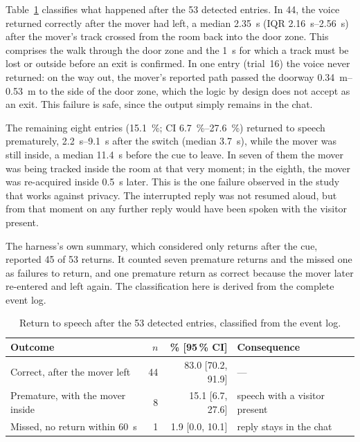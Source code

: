 Table~\ref{tab:ps-return} classifies what happened after the 53 detected
entries. In 44, the voice returned correctly after the mover had left, a median
\SI{2.35}{\second} (IQR \SIrange{2.16}{2.56}{\second}) after the mover's track
crossed from the room back into the door zone. This comprises the walk through
the door zone and the \SI{1}{\second} for which a track must be lost or outside
before an exit is confirmed. In one entry (trial~16) the voice never returned:
on the way out, the mover's reported path passed the doorway
\SIrange{0.34}{0.53}{\metre} to the side of the door zone, which the logic by
design does not accept as an exit. This failure is safe, since the output
simply remains in the chat.

The remaining eight entries (\SI{15.1}{\percent}; CI
\SIrange{6.7}{27.6}{\percent}) returned to speech prematurely,
\SIrange{2.2}{9.1}{\second} after the switch (median \SI{3.7}{\second}), while
the mover was still inside, a median \SI{11.4}{\second} before the cue to
leave. In seven of them the mover was being tracked inside the room at that
very moment; in the eighth, the mover was re-acquired inside
\SI{0.5}{\second} later. This is the one failure observed in the study that
works against privacy. The interrupted reply was not resumed aloud, but from
that moment on any further reply would have been spoken with the visitor
present.

The harness's own summary, which considered only returns after the cue,
reported 45 of 53 returns. It counted seven premature returns and the missed
one as failures to return, and one premature return as correct because the
mover later re-entered and left again. The classification here is derived from
the complete event log.

\begin{table}[htbp]
  \centering
  \caption{Return to speech after the 53 detected entries, classified from the
  event log.}
  \label{tab:ps-return}
  \begin{tabular}{lrrl}
    \toprule
    Outcome & $n$ & \% [95\,\% CI] & Consequence \\
    \midrule
    Correct, after the mover left            & 44 & 83.0 [70.2, 91.9] & --- \\
    Premature, with the mover inside         &  8 & 15.1 [6.7, 27.6]  & speech with a visitor present \\
    Missed, no return within \SI{60}{\second} &  1 & 1.9 [0.0, 10.1]   & reply stays in the chat \\
    \bottomrule
  \end{tabular}
\end{table}

